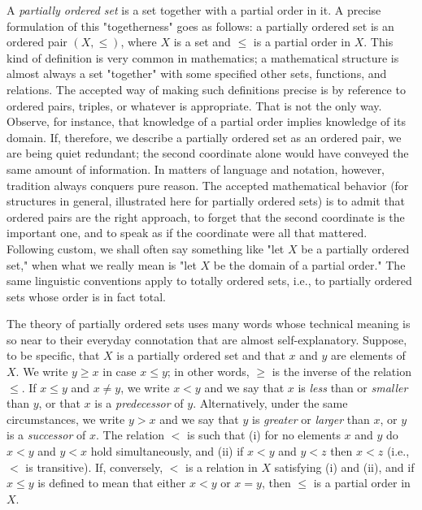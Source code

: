 A \textit{partially ordered set} is a set together with a partial order in it. A precise formulation of this "togetherness" goes as follows: a partially ordered set is an ordered pair $(X, \le )$, where $X$ is a set and $\le$ is a partial order in $X$. This kind of definition is very common in mathematics; a mathematical structure is almost always a set "together" with some specified other sets, functions, and relations. The accepted way of making such definitions precise is by reference to ordered pairs, triples, or whatever is appropriate. That is not the only way. Observe, for instance, that knowledge of a partial order implies knowledge of its domain. If, therefore, we describe a partially ordered set as an ordered pair, we are being quiet redundant; the second  coordinate alone would have conveyed the same amount of information. In matters of language and notation, however, tradition always conquers pure reason. The accepted mathematical behavior (for structures in general, illustrated here for partially ordered sets) is to admit that ordered pairs are the right approach, to forget that the second coordinate is the important one, and to speak as if the coordinate were all that mattered. Following custom, we shall often say something like "let $X$ be a partially ordered set," when what we really mean is "let $X$ be the domain of a partial order." The same linguistic conventions apply to totally ordered sets, i.e., to partially ordered sets whose order is in fact total. 

The theory of partially ordered sets uses many words whose technical meaning is so near to their everyday connotation that are almost self-explanatory. Suppose, to be specific, that $X$ is a partially ordered set and that $x$ and $y$ are elements of $X$. We write $y \ge x$ in case $x \le y$; in other words, $\ge$ is the inverse of the relation $\le$. If $x \le y$ and $x \neq y$, we write $x < y$ and we say that $x$ is \textit{less} than or \textit{smaller} than $y$, or that $x$ is a \textit{predecessor} of $y$. Alternatively, under the same circumstances, we write $y > x$ and we say that $y$ is \textit{greater} or \textit{larger} than $x$, or $y$ is a \textit{successor} of $x$. The relation $<$ is such that (i) for no elements $x$ and $y$ do $x < y$ and $y < x$ hold simultaneously, and (ii) if $x < y$ and $y < z$ then $x < z$ (i.e., $<$ is transitive). If, conversely, $<$ is a relation in $X$ satisfying (i) and (ii), and if $x \le y$ is defined to mean that either $x < y$ or $x = y$, then $\le$ is a partial order in $X$. 

